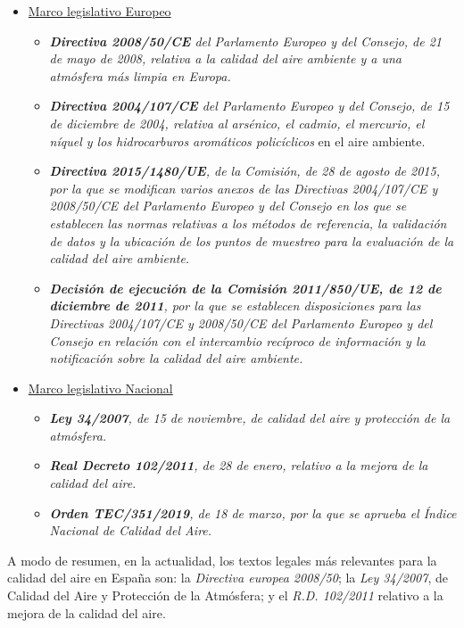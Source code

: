 \begin{itemize}
\item  \underline{Marco legislativo Europeo}
	\begin{itemize}
	\item \textit{\textbf{Directiva 2008/50/CE} del Parlamento Europeo y del Consejo, de 21 de mayo de 2008, relativa a la calidad del aire ambiente y a una atmósfera más limpia en Europa.}
	\item \textit{\textbf{Directiva 2004/107/CE} del Parlamento Europeo y del Consejo, de 15 de diciembre de 2004, relativa al arsénico, el cadmio, el mercurio, el níquel y los hidrocarburos aromáticos policíclicos}
	en el aire ambiente.
	\item \textit{\textbf{Directiva 2015/1480/UE}, de la Comisión, de 28 de agosto de 2015, por la que se modifican varios anexos de las Directivas 2004/107/CE y 2008/50/CE del Parlamento Europeo y del Consejo en los que se establecen las normas relativas a los métodos de referencia, la validación de datos y la ubicación de los puntos de muestreo para la evaluación de la calidad del aire ambiente.}
	\item \textit{\textbf{Decisión de ejecución de la Comisión 2011/850/UE, de 12 de diciembre de 2011}, por la que se establecen disposiciones para las Directivas 2004/107/CE y 2008/50/CE del Parlamento Europeo y del Consejo en relación con el intercambio recíproco de información y la notificación sobre la calidad del aire ambiente.}
	\end{itemize}
\item  \underline{Marco legislativo Nacional}
	\begin{itemize}
	\item \textit{\textbf{Ley 34/2007}, de 15 de noviembre, de calidad del aire y protección de la atmósfera.}
	\item \textit{\textbf{Real Decreto 102/2011}, de 28 de enero, relativo a la mejora de la calidad del aire.}
	\item \textit{\textbf{Orden TEC/351/2019}, de 18 de marzo, por la que se aprueba el Índice Nacional de Calidad del Aire.}
	\end{itemize}
\end{itemize}

A modo de resumen, en la actualidad, los textos legales más relevantes para la calidad del aire en España son: la \textit{Directiva europea 2008/50}; la \textit{Ley 34/2007}, de Calidad del Aire y Protección de la Atmósfera; y el \textit{R.D. 102/2011 }relativo a la mejora de la calidad del aire.

